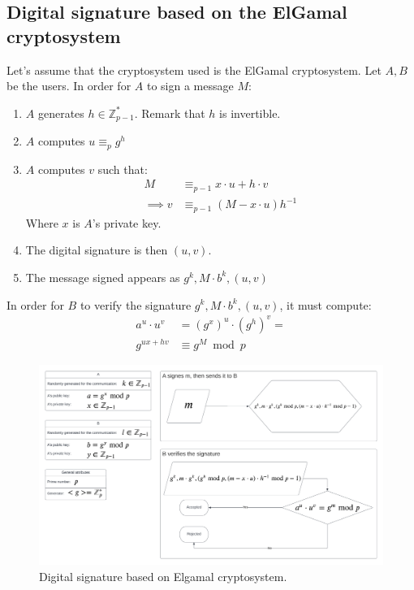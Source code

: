\subsection{Digital signature based on the ElGamal cryptosystem}
Let's assume that the cryptosystem used is the ElGamal cryptosystem. Let $A, B$ be the users.\newline
In order for $A$ to sign a message $M$:
\begin{enumerate}
    \item $A$ generates $h \in \mathbb{Z}_{p-1}^{*}$. Remark that $h$ is invertible.
    \item $A$ computes $u \equiv_{p} g^{h}$
    \item $A$ computes $v$ such that:
    \begin{align*}
        M &\equiv_{p-1} x \cdot u + h \cdot v\\
        \implies v &\equiv_{p-1} (M - x \cdot u) h^{-1}
    \end{align*}
    Where $x$ is $A$'s private key.
    \item The digital signature is then $(u, v)$.
    \item The message signed appears as $g^{k}, M \cdot b^{k}, (u,v)$
\end{enumerate}

In order for $B$ to verify the signature $g^{k}, M \cdot b^{k}, (u,v)$,
it must compute:
\begin{align*}
    a^{u} \cdot u^{v} &= (g^{x})^{u} \cdot (g^{h})^{v} =\\
    g^{ux + hv} &\equiv g^{M} \bmod p
\end{align*}
\begin{figure}[h]
    \centering
    \includegraphics[width=\textwidth]{img/DigSig_ElG.png}
    \caption{Digital signature based on Elgamal cryptosystem.}
\end{figure}
